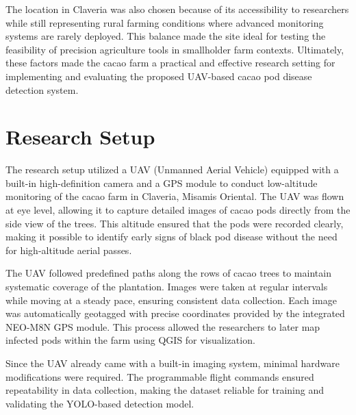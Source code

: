The location in Claveria was also chosen because of its accessibility to researchers while still representing rural farming conditions where advanced monitoring systems are rarely deployed.
This balance made the site ideal for testing the feasibility of precision agriculture tools in smallholder farm contexts.
Ultimately, these factors made the cacao farm a practical and effective research setting for implementing and evaluating the proposed UAV-based cacao pod disease detection system.

\section{Research Setup}

The research setup utilized a UAV (Unmanned Aerial Vehicle) equipped with a built-in high-definition camera and a GPS module to conduct low-altitude monitoring of the cacao farm in Claveria, Misamis Oriental.
The UAV was flown at eye level, allowing it to capture detailed images of cacao pods directly from the side view of the trees.
This altitude ensured that the pods were recorded clearly, making it possible to identify early signs of black pod disease without the need for high-altitude aerial passes.

The UAV followed predefined paths along the rows of cacao trees to maintain systematic coverage of the plantation.
Images were taken at regular intervals while moving at a steady pace, ensuring consistent data collection.
Each image was automatically geotagged with precise coordinates provided by the integrated NEO-M8N GPS module.
This process allowed the researchers to later map infected pods within the farm using QGIS for visualization.

Since the UAV already came with a built-in imaging system, minimal hardware modifications were required. The programmable flight commands ensured repeatability in data collection, making the dataset reliable for training and validating the YOLO-based detection model.

